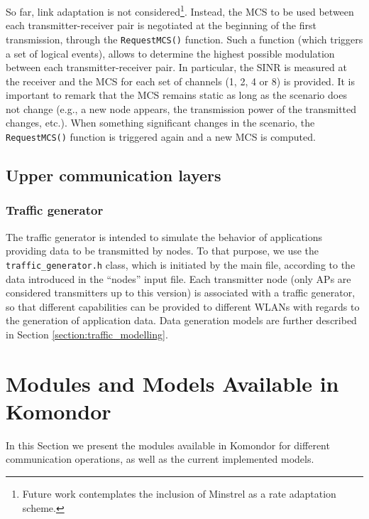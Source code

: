 \documentclass[a4paper]{article}
\begin{document}
	So far, link adaptation is not considered\footnote{Future work contemplates the inclusion of Minstrel as a rate adaptation scheme.}. Instead, the MCS to be used between each transmitter-receiver pair is negotiated at the beginning of the first transmission, through the \texttt{RequestMCS()} function. Such a function (which triggers a set of logical events), allows to determine the highest possible modulation between each transmitter-receiver pair. In particular, the SINR is measured at the receiver and the MCS for each set of channels (1, 2, 4 or 8) is provided. It is important to remark that the MCS remains static as long as the scenario does not change (e.g., a new node appears, the transmission power of the transmitted changes, etc.). When something significant changes in the scenario, the \texttt{RequestMCS()} function is triggered again and a new MCS is computed.
	
\subsection{Upper communication layers}

	\subsubsection{Traffic generator}
	\label{section:traffic_generator}
	The traffic generator is intended to simulate the behavior of applications providing data to be transmitted by nodes. To that purpose, we use the \texttt{traffic\_generator.h} class, which is initiated by the main file, according to the data introduced in the ``nodes'' input file. Each transmitter node (only APs are considered transmitters up to this version) is associated with a traffic generator, so that different capabilities can be provided to different WLANs with regards to the generation of application data. Data generation models are further described in Section \ref{section:traffic_modelling}.

\section{Modules and Models Available in Komondor}
\label{section:models}
In this Section we present the modules available in Komondor for different communication operations, as well as the current implemented models.
\end{document}
